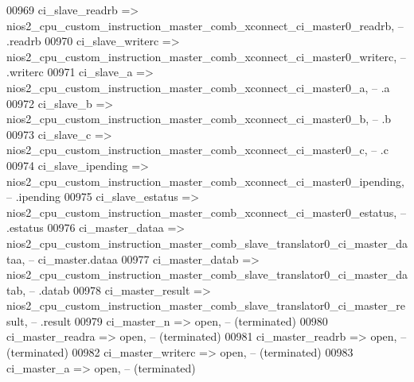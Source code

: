 \begin{DoxyCode}
00969             ci\_slave\_readrb     => 
      nios2_cpu_custom_instruction_master_comb_xconnect_ci_master0_readrb,\textcolor{keyword}{         --          .readrb}
00970             ci\_slave\_writerc    => 
      nios2_cpu_custom_instruction_master_comb_xconnect_ci_master0_writerc,\textcolor{keyword}{        --          .writerc}
00971             ci\_slave\_a          => 
      nios2_cpu_custom_instruction_master_comb_xconnect_ci_master0_a,\textcolor{keyword}{              --          .a}
00972             ci\_slave\_b          => 
      nios2_cpu_custom_instruction_master_comb_xconnect_ci_master0_b,\textcolor{keyword}{              --          .b}
00973             ci\_slave\_c          => 
      nios2_cpu_custom_instruction_master_comb_xconnect_ci_master0_c,\textcolor{keyword}{              --          .c}
00974             ci\_slave\_ipending   => 
      nios2_cpu_custom_instruction_master_comb_xconnect_ci_master0_ipending,\textcolor{keyword}{       --          .ipending}
00975             ci\_slave\_estatus    => 
      nios2_cpu_custom_instruction_master_comb_xconnect_ci_master0_estatus,\textcolor{keyword}{        --          .estatus}
00976             ci\_master\_dataa     => 
      nios2_cpu_custom_instruction_master_comb_slave_translator0_ci_master_dataa,\textcolor{keyword}{  -- ci\_master.dataa}
00977             ci\_master\_datab     => 
      nios2_cpu_custom_instruction_master_comb_slave_translator0_ci_master_datab,\textcolor{keyword}{  --          .datab}
00978             ci\_master\_result    => 
      nios2_cpu_custom_instruction_master_comb_slave_translator0_ci_master_result,\textcolor{keyword}{ --          .result}
00979             ci\_master\_n         => \textcolor{keywordflow}{open},\textcolor{keyword}{                                                                   
           -- (terminated)}
00980             ci\_master\_readra    => \textcolor{keywordflow}{open},\textcolor{keyword}{                                                                   
           -- (terminated)}
00981             ci\_master\_readrb    => \textcolor{keywordflow}{open},\textcolor{keyword}{                                                                   
           -- (terminated)}
00982             ci\_master\_writerc   => \textcolor{keywordflow}{open},\textcolor{keyword}{                                                                   
           -- (terminated)}
00983             ci\_master\_a         => \textcolor{keywordflow}{open},\textcolor{keyword}{                                                                   
           -- (terminated)}

\end{DoxyCode}
